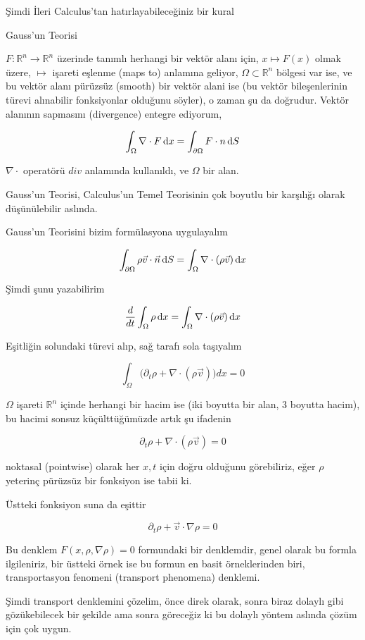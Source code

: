 \documentclass[12pt,fleqn]{article}\usepackage{../../common}
\begin{document}
Şimdi İleri Calculus'tan hatırlayabileceğiniz bir kural 

Gauss'un Teorisi

$F: \mathbb{R}^n \to \mathbb{R}^n$ üzerinde tanımlı herhangi bir vektör alanı için,
$x \mapsto F(x)$ olmak üzere, $\mapsto$ işareti eşlenme (maps to) anlamına
geliyor, $\Omega \subset \mathbb{R}^n$ bölgesi var ise, ve bu vektör alanı
pürüzsüz (smooth) bir vektör alani ise (bu vektör bileşenlerinin
türevi alınabilir fonksiyonlar olduğunu söyler), o zaman şu da
doğrudur. Vektör alanının sapmasını (divergence) entegre ediyorum, 

$$ 
\int_\Omega \nabla \cdot F \,\mathrm{d} x =
\int_{\partial \Omega} F \cdot n \,\mathrm{d} S
$$

$\nabla \cdot$ operatörü $div$ anlamında kullanıldı, ve $\Omega$ bir alan. 

Gauss'un Teorisi, Calculus'un Temel Teorisinin çok boyutlu bir karşılığı
olarak düşünülebilir aslında.

Gauss'un Teorisini bizim formülasyona uygulayalım

$$ \int_{\partial \Omega} \rho \vec{v} \cdot \vec{n} \,\mathrm{d} S =
\int_\Omega \nabla \cdot (\rho \vec{v}) \,\mathrm{d} x 
$$

Şimdi şunu yazabilirim

$$
\frac{d}{dt} \int_\Omega \rho \,\mathrm{d} x = 
\int_\Omega \nabla \cdot (\rho \vec{v}) \,\mathrm{d} x
 $$

Eşitliğin solundaki türevi alıp, sağ tarafı sola taşıyalım

$$ \int_\Omega \bigg( 
\partial_t \rho + \nabla \cdot (\rho \vec{v}) 
\bigg)dx = 0
 $$

$\Omega$ işareti $\mathbb{R}^n$ içinde herhangi bir hacim ise (iki boyutta bir
alan, 3 boyutta hacim), bu hacimi sonsuz küçülttüğümüzde artık şu ifadenin 

$$ \partial_t \rho + \nabla \cdot (\rho \vec{v})  = 0 $$

noktasal (pointwise) olarak her $x,t$ için doğru olduğunu görebiliriz, eğer
$\rho$ yeterinç pürüzsüz bir fonksiyon ise tabii ki.

Üstteki fonksiyon suna da eşittir

$$ \partial_t \rho + \vec{v} \cdot \nabla \rho = 0$$

Bu denklem $F(x,\rho,\nabla \rho)=0$ formundaki bir denklemdir, genel
olarak bu formla ilgileniriz, bir üstteki örnek ise bu formun en basit
örneklerinden biri, transportasyon fenomeni (transport phenomena) denklemi.

Şimdi transport denklemini çözelim, önce direk olarak, sonra biraz dolaylı
gibi gözükebilecek bir şekilde ama sonra göreceğiz ki bu dolaylı yöntem
aslında çözüm için çok uygun. 
\end{document}
